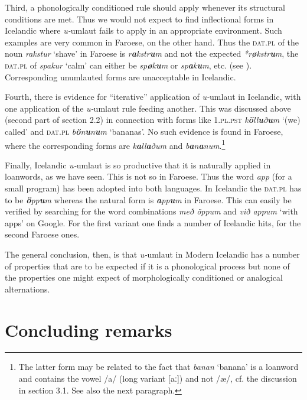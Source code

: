\documentclass[output=paper,
modfonts
]{LSP/langsci}
\begin{document}
\begin{exe}
Third, a phonologically conditioned rule should apply whenever its
structural conditions are met. Thus we would not expect to find
inflectional forms in Icelandic where \emph{u-}umlaut fails to apply in
an appropriate environment. Such examples are very common in Faroese, on
the other hand. Thus the \textsc{dat.pl} of the noun \emph{rakstur}
`shave' in Faroese is \emph{r\textbf{a}kstr\textbf{u}m} and not the
expected \emph{*r\textbf{ø}kstr\textbf{u}m}, the \textsc{dat.pl} of
\emph{spakur} `calm' can either be \emph{sp\textbf{ø}k\textbf{u}m} or
\emph{sp\textbf{a}k\textbf{u}m}, etc. (see \citealt[79, 100, passim]{thrainsson2012}). Corresponding unumlauted forms are unacceptable in
Icelandic.

Fourth, there is evidence for ``iterative'' application of
\emph{u-}umlaut in Icelandic, with one application of the
\emph{u-}umlaut rule feeding another. This was discussed above (second
part of section 2.2) in connection with forms like \textsc{1.pl.pst}
\emph{k\textbf{ö}ll\textbf{u}ð\textbf{u}m} `(we) called' and
\textsc{dat.pl} \emph{b\textbf{ö}n\textbf{u}n\textbf{u}m} `bananas'. No
such evidence is found in Faroese, where the corresponding forms are
\emph{k\textbf{a}ll\textbf{a}ðum} and
\emph{b\textbf{a}n\textbf{a}num}.\footnote{The latter form may be
  related to the fact that \emph{banan} `banana' is a loanword and
  contains the vowel /a/ (long variant {[}aː{]}) and not /æ/, cf. the
  discussion in section 3.1. See also the next paragraph.}

Finally, Icelandic \emph{u-}umlaut is so productive that it is naturally
applied in loanwords, as we have seen. This is not so in Faroese. Thus
the word \emph{app} (for a small program) has been adopted into both
languages. In Icelandic the \textsc{dat.pl} has to be
\emph{\textbf{ö}pp\textbf{u}m} whereas the natural form is
\emph{\textbf{a}pp\textbf{u}m} in Faroese. This can easily be verified
by searching for the word combinations \emph{með öppum} and \emph{við
appum} `with apps' on Google. For the first variant one finds a number
of Icelandic hits, for the second Faroese ones.

The general conclusion, then, is that \emph{u-}umlaut in Modern
Icelandic has a number of properties that are to be expected if it is a
phonological process but none of the properties one might expect of
morphologically conditioned or analogical alternations.


\section{Concluding remarks}\label{concluding-remarks}


\end{exe}
\end{document}

